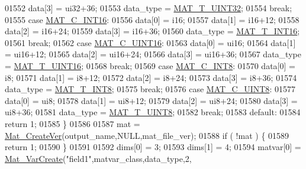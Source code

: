 \begin{DoxyCode}
{{{{{01552             data[3] = ui32+36;
01553             data\_type = \hyperlink{group___m_a_t_ggacf7b3b879282b7ab3a51190e49bf3453aa397e285a23fe240368b752897652c6a}{MAT\_T\_UINT32};
01554             \textcolor{keywordflow}{break};
01555         \textcolor{keywordflow}{case} \hyperlink{group___m_a_t_ggad4d60ae7b709fc81bfd744fb4c857c40a40370e9de516c5036a67a5865c071006}{MAT\_C\_INT16}:
01556             data[0] = i16;
01557             data[1] = i16+12;
01558             data[2] = i16+24;
01559             data[3] = i16+36;
01560             data\_type = \hyperlink{group___m_a_t_ggacf7b3b879282b7ab3a51190e49bf3453a8c5b2e381946e95ea8d81ac216743302}{MAT\_T\_INT16};
01561             \textcolor{keywordflow}{break};
01562         \textcolor{keywordflow}{case} \hyperlink{group___m_a_t_ggad4d60ae7b709fc81bfd744fb4c857c40a8bede21dbf6c1edc0bbccc1481bccae7}{MAT\_C\_UINT16}:
01563             data[0] = ui16;
01564             data[1] = ui16+12;
01565             data[2] = ui16+24;
01566             data[3] = ui16+36;
01567             data\_type = \hyperlink{group___m_a_t_ggacf7b3b879282b7ab3a51190e49bf3453a05bc7af7680aa68be95126ae0a4c2e31}{MAT\_T\_UINT16};
01568             \textcolor{keywordflow}{break};
01569         \textcolor{keywordflow}{case} \hyperlink{group___m_a_t_ggad4d60ae7b709fc81bfd744fb4c857c40a984ff310f9e906100fcff95f704f43c5}{MAT\_C\_INT8}:
01570             data[0] = i8;
01571             data[1] = i8+12;
01572             data[2] = i8+24;
01573             data[3] = i8+36;
01574             data\_type = \hyperlink{group___m_a_t_ggacf7b3b879282b7ab3a51190e49bf3453a9807f5033ed4f9b548953742d9fd1658}{MAT\_T\_INT8};
01575             \textcolor{keywordflow}{break};
01576         \textcolor{keywordflow}{case} \hyperlink{group___m_a_t_ggad4d60ae7b709fc81bfd744fb4c857c40a81270f8093cb4808e992c1d29d84d4e3}{MAT\_C\_UINT8}:
01577             data[0] = ui8;
01578             data[1] = ui8+12;
01579             data[2] = ui8+24;
01580             data[3] = ui8+36;
01581             data\_type = \hyperlink{group___m_a_t_ggacf7b3b879282b7ab3a51190e49bf3453a01c1bd7db68f90552862eb5d311be408}{MAT\_T\_UINT8};
01582             \textcolor{keywordflow}{break};
01583         \textcolor{keywordflow}{default}:
01584             \textcolor{keywordflow}{return} 1;
01585     \}
01586 
01587     mat = \hyperlink{group___m_a_t_ga22d404f203af7869c841400e7ad247cf}{Mat\_CreateVer}(output\_name,NULL,mat\_file\_ver);
01588     \textcolor{keywordflow}{if} ( !mat ) \{
01589         \textcolor{keywordflow}{return} 1;
01590     \}
01591 
01592     dims[0] = 3;
01593     dims[1] = 4;
01594     matvar[0] = \hyperlink{group___m_a_t_ga1c54a84bb4d810c6fccdb8869489eac4}{Mat\_VarCreate}(\textcolor{stringliteral}{"field1"},matvar\_class,data\_type,2,
}}}}}
\end{DoxyCode}
